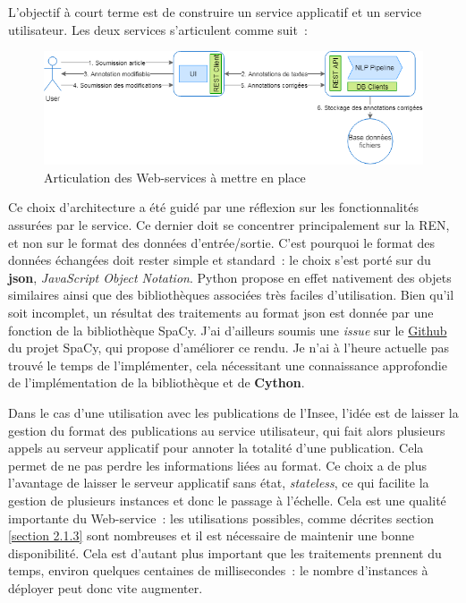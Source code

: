 L'objectif à court terme est de construire un service applicatif et un service utilisateur. Les deux services s'articulent comme suit~:
\vspace{10pt}
\begin{figure}[H]
    \centering
\includegraphics[scale=0.62]{images/Archi-pipeline-web.png}
    \caption{Articulation des Web-services à mettre en place}
    \label{fig:archi-pipeline-web}
\end{figure}
\vspace{10pt}

Ce choix d'architecture a été guidé par une réflexion sur les fonctionnalités assurées par le service. Ce dernier doit se concentrer principalement sur la REN, et non sur le format des données d'entrée/sortie. C'est pourquoi le format des données échangées doit rester simple et standard~: le choix s'est porté sur du \textbf{json}, \textit{JavaScript Object Notation}. Python propose en effet nativement des objets similaires ainsi que des bibliothèques associées très faciles d'utilisation. Bien qu'il soit incomplet, un résultat des traitements au format json est donnée par une fonction de la bibliothèque SpaCy. J'ai d'ailleurs soumis une \textit{issue} sur le \href{https://github.com/explosion/spaCy/issues/3987}{Github} \cite{spacy-issue} du projet SpaCy, qui propose d'améliorer ce rendu. Je n'ai à l'heure actuelle pas trouvé le temps de l'implémenter, cela nécessitant une connaissance approfondie de l'implémentation de la bibliothèque et de \textbf{Cython}.

Dans le cas d'une utilisation avec les publications de l'Insee, l'idée est de laisser la gestion du format des publications au service utilisateur, qui fait alors plusieurs appels au serveur applicatif pour annoter la totalité d'une publication. Cela permet de ne pas perdre les informations liées au format. Ce choix a de plus l'avantage de laisser le serveur applicatif sans état, \textit{stateless}, ce qui facilite la gestion de plusieurs instances et donc le passage à l'échelle. Cela est une qualité importante du Web-service~: les utilisations possibles, comme décrites section \ref{section 2.1.3} sont nombreuses et il est nécessaire de maintenir une bonne disponibilité. Cela est d'autant plus important que les traitements prennent du temps, environ quelques centaines de millisecondes~: le nombre d'instances à déployer peut donc vite augmenter.
\newline
\label{section 3.2.1}

